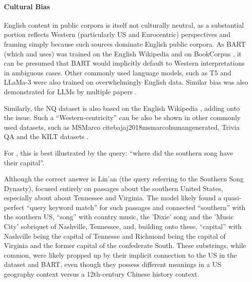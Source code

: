 \paragraph{Cultural Bias}

English content in public corpora is itself not culturally neutral, as a substantial portion reflects Western (particularly US and Eurocentric) perspectives and framing simply because such sources dominate English public corpora. As BART (which  and  uses) was trained on the English Wikipedia and on BookCorpus \cite{zhu-aligning,yinhan-liu-roberta-a}, it can be presumed that BART would implicitly default to Western interpretations in ambiguous cases. Other commonly used language models, such as T5 and LLaMa-3 \cite{colin-raffel-exploring-the,aaron-grattafiori-the-llama} were also trained on overwhelmingly English data. Similar bias was also demonstrated for LLMs %
by multiple papers \cite{tarek-naous-having-beer,md-abdul-aowal-detecting-natural,navigli-biases-in}. 

Similarly, the NQ dataset is also based on the English Wikipedia \cite{kwiatkowski-natural-questions}, adding onto the issue. Such a ``Western-centricity'' can be also be shown in other commonly used datasets, such as MSMarco cite{bajaj2018msmarcohumangenerated}, Trivia QA \cite{joshi-triviaqa-a} and the KILT datasets \cite{fabio-petroni-kilt-a}.

For , this is best illustrated by the query: ``where did the southern song have their capital''.

Although the correct answer is Lin'an (the query referring to the Southern Song Dynasty),  focused entirely on passages about the southern United States, especially about about Tennessee and Virginia. The model likely %
found a quasi-perfect ``query keyword match'' for such passages and connected ``southern'' with the southern US, ``song'' with country music, the 'Dixie' song and the 'Music City' sobriquet of Nashville, Tennessee, and, building onto these, ``capital'' with Nashville being the capital of Tennesse and Richmond being the capital of Virginia and the former capital of the confederate South. These substrings, while common, were likely propped up by their implicit connection to the US in the dataset and BART, even though they possess different meanings in a US geography context versus a 12th-century Chinese history context.


